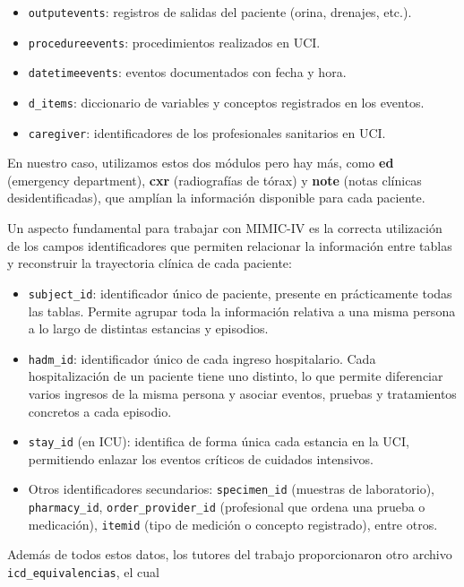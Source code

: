 \begin{itemize}
\begin{itemize}
        \item \texttt{outputevents}: registros de salidas del paciente (orina, drenajes, etc.).
        \item \texttt{procedureevents}: procedimientos realizados en UCI.
        \item \texttt{datetimeevents}: eventos documentados con fecha y hora.
        \item \texttt{d\_items}: diccionario de variables y conceptos registrados en los eventos.
        \item \texttt{caregiver}: identificadores de los profesionales sanitarios en UCI.
    \end{itemize}
\end{itemize}



En nuestro caso, utilizamos estos dos módulos pero hay más, como \textbf{ed} (emergency department), \textbf{cxr} (radiografías de tórax) y \textbf{note} (notas clínicas desidentificadas), que amplían la información disponible para cada paciente.

Un aspecto fundamental para trabajar con MIMIC-IV es la correcta utilización de los campos identificadores que permiten relacionar la información entre tablas y reconstruir la trayectoria clínica de cada paciente:

\begin{itemize}
    \item \texttt{subject\_id}: identificador único de paciente, presente en prácticamente todas las tablas. Permite agrupar toda la información relativa a una misma persona a lo largo de distintas estancias y episodios.
    \item \texttt{hadm\_id}: identificador único de cada ingreso hospitalario. Cada hospitalización de un paciente tiene uno distinto, lo que permite diferenciar varios ingresos de la misma persona y asociar eventos, pruebas y tratamientos concretos a cada episodio.
    \item \texttt{stay\_id} (en ICU): identifica de forma única cada estancia en la UCI, permitiendo enlazar los eventos críticos de cuidados intensivos.
    \item Otros identificadores secundarios: \texttt{specimen\_id} (muestras de laboratorio), \texttt{pharmacy\_id}, \texttt{order\_provider\_id} (profesional que ordena una prueba o medicación), \texttt{itemid} (tipo de medición o concepto registrado), entre otros.
\end{itemize}

Además de todos estos datos, los tutores del trabajo proporcionaron otro archivo \texttt{icd\_equivalencias}, el cual


